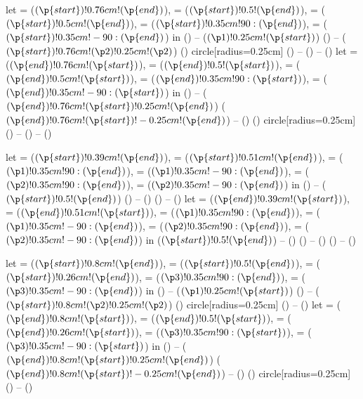 let
 = ($(\p{start})!0.76cm!(\p{end})$),
 = ($(\p{start})!0.5!(\p{end})$),
 = ($(\p{start})!0.5cm!(\p{end})$),
 = ($(\p{start})!0.35cm!90:(\p{end})$),
 = ($(\p{start})!0.35cm!-90:(\p{end})$)
in
() -- ($(\p1)!0.25cm!(\p{start})$)
() -- ($(\p{start})!0.76cm!(\p2)!0.25cm!(\p2)$)
() circle[radius=0.25cm]
() -- () -- ()
let
 = ($(\p{end})!0.76cm!(\p{start})$),
 = ($(\p{end})!0.5!(\p{start})$),
 = ($(\p{end})!0.5cm!(\p{start})$),
 = ($(\p{end})!0.35cm!90:(\p{start})$),
 = ($(\p{end})!0.35cm!-90:(\p{start})$)
in
() -- ($(\p{end})!0.76cm!(\p{start})!0.25cm!(\p{end})$)
($(\p{end})!0.76cm!(\p{start})!-0.25cm!(\p{end})$) -- ()
() circle[radius=0.25cm]
() -- () -- ()

let
 = ($(\p{start})!0.39cm!(\p{end})$),
 = ($(\p{start})!0.51cm!(\p{end})$),
 = ($(\p1)!0.35cm!90:(\p{end})$),
 = ($(\p1)!0.35cm!-90:(\p{end})$),
 = ($(\p2)!0.35cm!90:(\p{end})$),
 = ($(\p2)!0.35cm!-90:(\p{end})$)
in
() -- ($(\p{start})!0.5!(\p{end})$)
() -- ()
() -- ()
let
 = ($(\p{end})!0.39cm!(\p{start})$),
 = ($(\p{end})!0.51cm!(\p{start})$),
 = ($(\p1)!0.35cm!90:(\p{end})$),
 = ($(\p1)!0.35cm!-90:(\p{end})$),
 = ($(\p2)!0.35cm!90:(\p{end})$),
 = ($(\p2)!0.35cm!-90:(\p{end})$)
in
($(\p{start})!0.5!(\p{end})$) -- ()
() -- ()
() -- ()

let
 = ($(\p{start})!0.8cm!(\p{end})$),
 = ($(\p{start})!0.5!(\p{end})$),
 = ($(\p{start})!0.26cm!(\p{end})$),
 = ($(\p3)!0.35cm!90:(\p{end})$),
 = ($(\p3)!0.35cm!-90:(\p{end})$)
in
() -- ($(\p1)!0.25cm!(\p{start})$)
() -- ($(\p{start})!0.8cm!(\p2)!0.25cm!(\p2)$)
() circle[radius=0.25cm]
() -- ()
let
 = ($(\p{end})!0.8cm!(\p{start})$),
 = ($(\p{end})!0.5!(\p{start})$),
 = ($(\p{end})!0.26cm!(\p{start})$),
 = ($(\p3)!0.35cm!90:(\p{start})$),
 = ($(\p3)!0.35cm!-90:(\p{start})$)
in
() -- ($(\p{end})!0.8cm!(\p{start})!0.25cm!(\p{end})$)
($(\p{end})!0.8cm!(\p{start})!-0.25cm!(\p{end})$) -- ()
() circle[radius=0.25cm]
() -- ()
%
